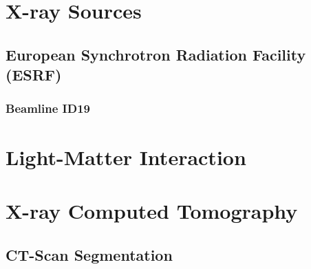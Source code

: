 \section{X-ray Sources}
\label{sec:sources}

\subsection{European Synchrotron Radiation Facility (ESRF)}
\label{sec:esrf}

\subsubsection{Beamline ID19}
\label{sec:id19}

\section{Light-Matter Interaction}
\label{sec:light-matter}

\section{X-ray Computed Tomography}
\label{sec:xray-ct}

\subsection{CT-Scan Segmentation}
\label{sec:ct-segmentation}